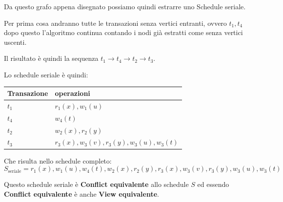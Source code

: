 \begin{exmp}
    Da questo grafo appena disegnato possiamo quindi estrarre uno Schedule seriale.

    Per prima cosa andranno tutte le transazioni senza vertici entranti, ovvero $t_1, t_4$ dopo questo l'algoritmo continua contando i nodi già estratti come senza vertici uscenti.

    Il risultato è quindi la sequenza $t_1 \rightarrow t_4 \rightarrow t_2 \rightarrow t_3$.
    
    Lo schedule seriale è quindi:

    
    \begin{center}
        \begin{tabularx}{10cm}{|p{25mm}|X|}
            \hline
            \rowcolor{gray!30}
            \textbf{Transazione} & \textbf{operazioni}\\
            \hline
            $t_1$& $r_1(x), w_1(u)$\\
            $t_4$& $w_4(t)$\\
            $t_2$& $w_2(x), r_2(y)$\\
            $t_3$& $r_3(x), w_3(v), r_3(y), w_3(u), w_3(t)$\\
            \hline
        \end{tabularx}
    \end{center}

    Che risulta nello schedule completo:
    \[S_\text{seriale} = r_1(x), w_1(u), w_4(t), w_2(x), r_2(y), r_3(x), w_3(v), r_3(y), w_3(u), w_3(t)\]

    Questo schedule seriale è \textbf{Conflict equivalente} allo schedule $S$ ed essendo \textbf{Conflict equivalente} è anche \textbf{View equivalente}.
\end{exmp}

